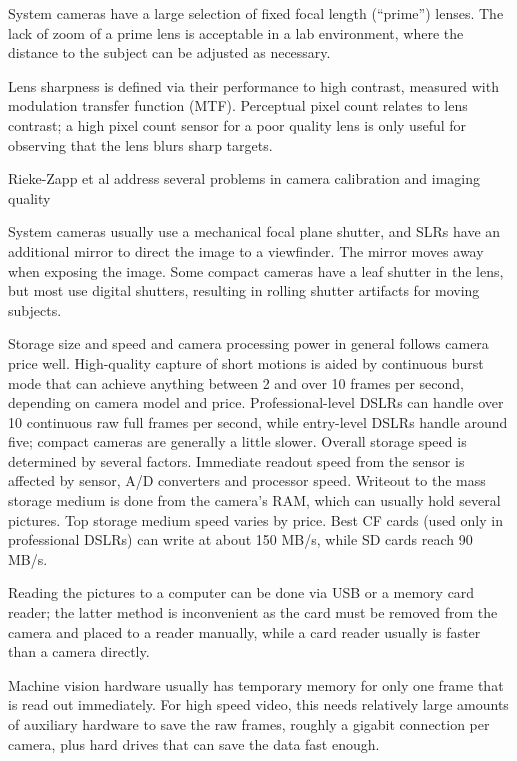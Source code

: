 System cameras have a large selection of fixed focal length (``prime'') lenses.
The lack of zoom of a prime lens is acceptable in a lab environment, where the distance to the subject can be adjusted as necessary.

Lens sharpness is defined via their performance to high contrast, measured with modulation transfer function (MTF).
Perceptual pixel count relates to lens contrast; a high pixel count sensor for a poor quality lens is only useful for observing that the lens blurs sharp targets.

Rieke-Zapp et al \cite{rieke2009evaluation} address several problems in camera calibration and imaging quality


System cameras usually use a mechanical focal plane shutter, and SLRs have an additional mirror to direct the image to a viewfinder.
The mirror moves away when exposing the image.
Some compact cameras have a leaf shutter in the lens, but most use digital shutters, resulting in rolling shutter artifacts for moving subjects.

Storage size and speed and camera processing power in general follows camera price well.
High-quality capture of short motions is aided by continuous burst mode that can achieve anything between 2 and over 10 frames per second, depending on camera model and price.
Professional-level DSLRs can handle over 10 continuous raw full frames per second, while entry-level DSLRs handle around five;
compact cameras are generally a little slower.
Overall storage speed is determined by several factors.
Immediate readout speed from the sensor is affected by sensor, A/D converters and processor speed.
Writeout to the mass storage medium is done from the camera's RAM, which can usually hold several pictures.
Top storage medium speed varies by price.
Best CF cards (used only in professional DSLRs) can write at about 150 MB/s, while SD cards reach 90 MB/s.

Reading the pictures to a computer can be done via USB or a memory card reader; the latter method is inconvenient as the card must be removed from the camera and placed to a reader manually, while a card reader usually is faster than a camera directly.

Machine vision hardware usually has temporary memory for only one frame that is read out immediately.
For high speed video, this needs relatively large amounts of auxiliary hardware to save the raw frames, roughly a gigabit connection per camera, plus hard drives that can save the data fast enough.

